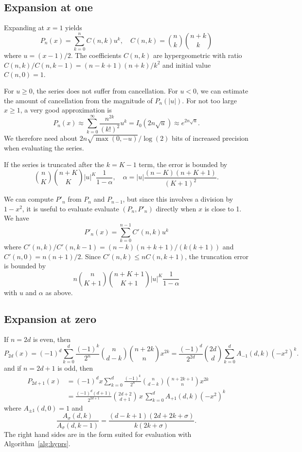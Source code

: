 \documentclass[11pt,a4paper]{article}
\begin{document}
\subsection{Expansion at one}

Expanding at $x = 1$ yields
$$P_n(x) = \sum_{k=0}^n C(n,k) u^k, \quad C(n,k) = {n \choose k} {n+k \choose k}$$
where $u = (x-1)/2$.
The coefficients $C(n,k)$ are hypergeometric with
ratio $C(n,k)/C(n,k-1) = (n-k+1)(n+k)/k^2$
and initial value $C(n,0) = 1$.

For $u \ge 0$, the series does not suffer from cancellation.
For $u < 0$, we can estimate the amount of
cancellation from the magnitude of $P_n(|u|)$.
For not too large $x \ge 1$, a very good approximation is
$$P_n(x) \approx \sum_{k=0}^{\infty} \frac{n^{2k}}{(k!)^2} u^k = I_0(2n\sqrt{u}) \approx e^{2n\sqrt{u}}.$$
We therefore need about $2n\sqrt{\max(0,-u)} / \log(2)$ bits
of increased precision when evaluating the series.

If the series is truncated after the $k = K - 1$ term,
the error is bounded by
$${n \choose K}{n+K \choose K} |u|^K \frac{1}{1-\alpha}, \quad \alpha = |u| \frac{(n-K)(n+K+1)}{(K+1)^2}.$$

We can compute $P'_n$ from $P_n$ and $P_{n-1}$, but since this
involves a division by $1-x^2$, it is useful to evaluate
evaluate $(P_n, P'_n)$ directly when $x$ is close to 1.
We have
$$P'_n(x) = \sum_{k=0}^{n-1} C'(n,k) u^k$$
where $C'(n,k)/C'(n,k-1) = (n-k)(n+k+1)/(k(k+1))$ and $C'(n,0) = n(n+1) / 2$.
Since $C'(n,k) \le n C(n,k+1)$, the truncation error is bounded by
$$n {n \choose K+1}{n+K+1 \choose K+1} |u|^K \frac{1}{1-\alpha}$$
with $u$ and $\alpha$ as above.

\subsection{Expansion at zero}

If $n = 2d$ is even, then
$$P_{2d}(x) = (-1)^d \sum_{k=0}^d \frac{(-1)^k}{2^n} {n \choose d-k} {n+2k \choose n} x^{2k} = \frac{(-1)^d}{2^{2d}} {2d \choose d} \sum_{k=0}^d A_{-1}(d,k) (-x^2)^k.$$
and if $n = 2d+1$ is odd, then
\begin{align*}
P_{2d+1}(x) &= (-1)^d x \sum_{k=0}^d \frac{(-1)^k}{2^n} {n \choose d-k} {n+2k+1 \choose n} x^{2k} \\
&= \frac{(-1)^d (d+1)}{2^{2d+1}} {2d+2 \choose d+1} \,x\, \sum_{k=0}^d A_{+1}(d,k) (-x^2)^k
\end{align*}
where $A_{\pm 1}(d,0) = 1$ and
$$\frac{A_{\sigma}(d,k)}{A_{\sigma}(d,k-1)} = \frac{(d-k+1) (2d+2k+\sigma)}{k (2k+\sigma)}.$$
The right hand sides are in the form suited for
evaluation with Algorithm~\ref{alg:hyprs}.
\end{document}

